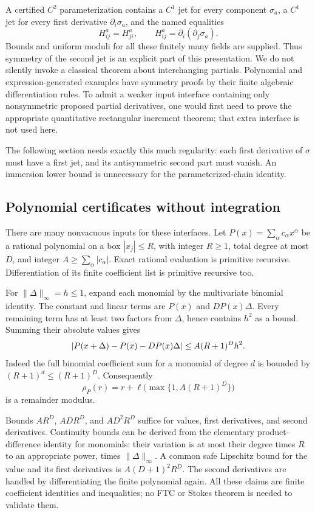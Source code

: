 A certified $C^2$ parameterization contains a $C^1$ jet for every
component $\sigma_a$, a $C^1$ jet for every first derivative
$\partial_i\sigma_a$, and the named equalities
\[
 H^a_{ij}=H^a_{ji},\qquad
 H^a_{ij}=\partial_i(\partial_j\sigma_a).
\]
Bounds and uniform moduli for all these finitely many fields are supplied.
Thus symmetry of the second jet is an explicit part of this presentation.
We do not silently invoke a classical theorem about interchanging
partials. Polynomial and expression-generated examples have symmetry
proofs by their finite algebraic differentiation rules. To admit a weaker
input interface containing only nonsymmetric proposed partial derivatives,
one would first need to prove the appropriate quantitative rectangular
increment theorem; that extra interface is not used here.

The following section needs exactly this much regularity: each first
derivative of $\sigma$ must have a first jet, and its antisymmetric second
part must vanish. An immersion lower bound is unnecessary for the
parameterized-chain identity.

\subsection{Polynomial certificates without integration}\label{sec:polynomial-jets}

There are many nonvacuous inputs for these interfaces. Let
$P(x)=\sum_\alpha c_\alpha x^\alpha$ be a rational polynomial on a box
$|x_j|\le R$, with integer $R\ge1$, total degree at most $D$, and integer
$A\ge\sum_\alpha|c_\alpha|$. Exact rational evaluation is primitive
recursive. Differentiation of its finite coefficient list is primitive
recursive too.

For $\|\Delta\|_\infty=h\le1$, expand each monomial by the multivariate
binomial identity. The constant and linear terms are $P(x)$ and
$DP(x)\Delta$. Every remaining term has at least two factors from
$\Delta$, hence contains $h^2$ as a bound. Summing their absolute values gives
\begin{equation}\label{eq:polynomial-jet}
 \left|P(x+\Delta)-P(x)-DP(x)\Delta\right|
 \le A(R+1)^D h^2.
\end{equation}
Indeed the full binomial coefficient sum for a monomial of degree $d$
is bounded by $(R+1)^d\le(R+1)^D$.
Consequently
\[
 \rho_P(r)=r+\ell\bigl(\max\{1,A(R+1)^D\}\bigr)
\]
is a remainder modulus.

Bounds $AR^D$, $ADR^D$, and $AD^2R^D$ suffice for values, first
derivatives, and second derivatives. Continuity bounds can be derived
from the elementary product-difference identity for monomials: their
variation is at most their degree times $R$ to an appropriate power,
times $\|\Delta\|_\infty$. A common safe Lipschitz bound for the value
and its first derivatives is $A(D+1)^2R^D$. The second derivatives
are handled by differentiating the finite polynomial again. All these
claims are finite coefficient identities and inequalities; no FTC or
Stokes theorem is needed to validate them.
